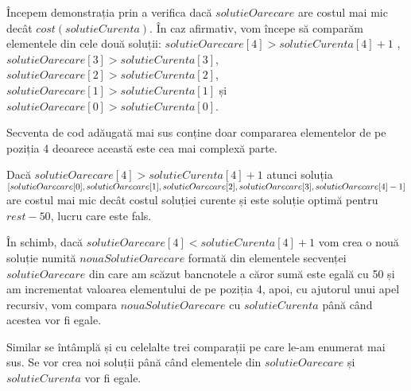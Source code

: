 \begin{enumerate}
\begin{lstlisting}
\end{lstlisting}
\par
Începem demonstrația prin a verifica dacă $solutieOarecare$ are costul mai mic decât $cost(solutieCurenta)$. În caz afirmativ, vom începe să comparăm elementele din cele două soluții: $solutieOarecare[4] > solutieCurenta[4] + 1$ ,\\ $solutieOarecare[3] > solutieCurenta[3]$, $solutieOarecare[2] > solutieCurenta[2]$, $solutieOarecare[1] > solutieCurenta[1]$ și $solutieOarecare[0] > solutieCurenta[0]$.  \par   
Secventa de cod adăugată mai sus conține doar compararea elementelor de pe poziția 4 deoarece această este cea mai complexă parte. \par
Dacă $solutieOarecare[4] > solutieCurenta[4] + 1$  atunci soluția \\ $[solutieOarecare[0], solutieOarecare[1], solutieOarecare[2], solutieOarecare[3], \\ solutieOarecare[4] - 1]$ are costul mai mic decât costul soluției curente și este soluție optimă pentru $rest-50$, lucru care este fals.\par
În schimb, dacă $solutieOarecare[4] < solutieCurenta[4] + 1$ vom crea o nouă soluție numită $nouaSolutieOarecare$ formată din elementele secvenței $solutieOarecare$ din care am scăzut bancnotele a căror sumă este egală cu 50 și am incrementat valoarea elementului de pe poziția 4, apoi, cu ajutorul unui apel recursiv, vom compara $nouaSolutieOarecare$ cu $solutieCurenta$ până când acestea vor fi egale.\par
Similar se întâmplă și cu celelalte trei comparații pe care le-am enumerat mai sus. Se vor crea noi soluții până când elementele din $solutieOarecare$ și $solutieCurenta$ vor fi egale.
\end{enumerate}
\vspace{1cm}




